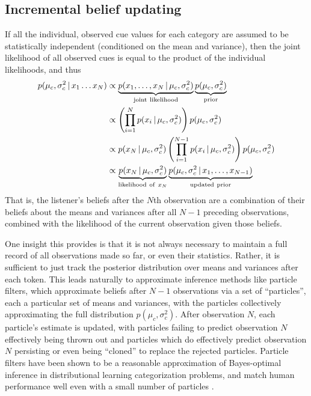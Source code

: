 \subsection{Incremental belief updating}
\label{sec:incr-beli-updat}

If all the individual, observed cue values for each category are assumed to be statistically independent (conditioned on the mean and variance), then the joint likelihood of all observed cues is equal to the product of the individual likelihoods, and thus
\begin{align}
  \label{eq:6}
  p(\mu_c, \sigma^2_c \,|\, x_1 \ldots x_N) &\propto \underbrace{p(x_1, \ldots, x_N \,|\, \mu_c, \sigma^2_c)}_{\mathrm{joint\ likelihood}} \underbrace{p(\mu_c, \sigma^2_c)}_{\mathrm{prior}} \\
  &\propto \left( \prod_{i=1}^N p(x_i \,|\, \mu_c, \sigma^2_c)  \right) p(\mu_c, \sigma^2_c) \\
  &\propto p(x_N \,|\, \mu_c, \sigma^2_c) \left( \prod_{i=1}^{N-1} p(x_i \,|\, \mu_c, \sigma^2_c)  \right) p(\mu_c, \sigma^2_c) \\
  &\propto \underbrace{p(x_N \,|\, \mu_c, \sigma^2_c)}_{\mathrm{likelihood\ of\ }x_N} \underbrace{p(\mu_c, \sigma^2_c \,|\, x_1, \ldots, x_{N-1})}_{\mathrm{updated\ prior}}
\end{align}
That is, the listener's beliefs after the $N$th observation are a combination of their beliefs about the means and variances after all $N-1$ preceding observations, combined with the likelihood of the current observation given those beliefs.

One insight this provides is that it is not always necessary to maintain a full record of all observations made so far, or even their statistics.  Rather, it is sufficient to just track the posterior distribution over means and variances after each token.  This leads naturally to approximate inference methods like particle filters, which approximate beliefs after $N-1$ observations via a set of ``particles'', each a particular set of means and variances, with the particles collectively approximating the full distribution $p(\mu_c, \sigma^2_c)$.  After observation $N$, each particle's estimate is updated, with particles failing to predict observation $N$ effectively being thrown out and particles which do effectively predict observation $N$ persisting or even being ``cloned'' to replace the rejected particles.  Particle filters have been shown to be a reasonable approximation of Bayes-optimal inference in distributional learning categorization problems, and match human performance well even with a small number of particles \autocite{Sanborn2010}.

